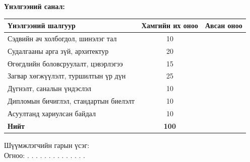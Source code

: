 \begin{titlepage}
\vspace{0.5cm}
\noindent \textbf{Үнэлгээний санал:}
\begin{table}[H]
\centering
\begin{tabular}{|l|c|c|}
\hline
\textbf{Үнэлгээний шалгуур} & \textbf{Хамгийн их оноо} & \textbf{Авсан оноо} \\ \hline
Сэдвийн ач холбогдол, шинэлэг тал & 10 & \\ \hline
Судалгааны арга зүй, архитектур & 20 & \\ \hline
Өгөгдлийн боловсруулалт, цэвэрлэгээ & 15 & \\ \hline
Загвар хөгжүүлэлт, туршилтын үр дүн & 25 & \\ \hline
Дүгнэлт, саналын үндэслэл & 10 & \\ \hline
Дипломын бичиглэл, стандартын биелэлт & 10 & \\ \hline
Асуултанд хариулсан байдал & 10 & \\ \hline
\textbf{Нийт} & \textbf{100} & \\ \hline
\end{tabular}
\end{table}

\vspace{1cm}
\begin{flushright}
Шүүмжлэгчийн гарын үсэг: \makebox[4cm]{\dotfill} \\
Огноо: . . . . . . . . . . . . . .
\end{flushright}

\end{titlepage}

